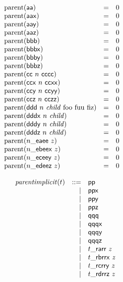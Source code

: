 $$
\begin{array}{@{}lcl@{}l@{}}
{\mathrm{parent}}(\mathsf{aa}) &=& 0 \\
{\mathrm{parent}}(\mathsf{aax}) &=& 0 \\
{\mathrm{parent}}(\mathsf{aay}) &=& 0 \\
{\mathrm{parent}}(\mathsf{aaz}) &=& 0 \\
{\mathrm{parent}}(\mathsf{bbb}) &=& 0 \\
{\mathrm{parent}}(\mathsf{bbbx}) &=& 0 \\
{\mathrm{parent}}(\mathsf{bbby}) &=& 0 \\
{\mathrm{parent}}(\mathsf{bbbz}) &=& 0 \\
{\mathrm{parent}}(\mathsf{cc}~n~\mathsf{cccc}) &=& 0 \\
{\mathrm{parent}}(\mathsf{ccx}~n~\mathsf{ccxx}) &=& 0 \\
{\mathrm{parent}}(\mathsf{ccy}~n~\mathsf{ccyy}) &=& 0 \\
{\mathrm{parent}}(\mathsf{ccz}~n~\mathsf{cczz}) &=& 0 \\
{\mathrm{parent}}(\mathsf{ddd}~n~{\mathit{child}}~{\mathrm{foo}}~{\mathrm{fuu}}~{\mathrm{fiz}}) &=& 0 \\
{\mathrm{parent}}(\mathsf{dddx}~n~{\mathit{child}}) &=& 0 \\
{\mathrm{parent}}(\mathsf{dddy}~n~{\mathit{child}}) &=& 0 \\
{\mathrm{parent}}(\mathsf{dddz}~n~{\mathit{child}}) &=& 0 \\
{\mathrm{parent}}({n}{\mathsf{\_}}{\mathsf{ea}}{\mathsf{ee}}~z) &=& 0 \\
{\mathrm{parent}}({n}{\mathsf{\_}}{\mathsf{eb}}{\mathsf{eex}}~z) &=& 0 \\
{\mathrm{parent}}({n}{\mathsf{\_}}{\mathsf{ec}}{\mathsf{eey}}~z) &=& 0 \\
{\mathrm{parent}}({n}{\mathsf{\_}}{\mathsf{ed}}{\mathsf{eez}}~z) &=& 0 \\
\end{array}
$$

$$
\begin{array}{@{}lrrl@{}l@{}}
& {\mathit{parentimplicit}}(t) &::=& \mathsf{pp} \\ &&|&
\mathsf{ppx} \\ &&|&
\mathsf{ppy} \\ &&|&
\mathsf{ppz} \\ &&|&
\mathsf{qqq} \\ &&|&
\mathsf{qqqx} \\ &&|&
\mathsf{qqqy} \\ &&|&
\mathsf{qqqz} \\ &&|&
{t}{\mathsf{\_}}{\mathsf{ra}}{\mathsf{rr}}~z \\ &&|&
{t}{\mathsf{\_}}{\mathsf{rb}}{\mathsf{rrx}}~z \\ &&|&
{t}{\mathsf{\_}}{\mathsf{rc}}{\mathsf{rry}}~z \\ &&|&
{t}{\mathsf{\_}}{\mathsf{rd}}{\mathsf{rrz}}~z \\
\end{array}
$$

